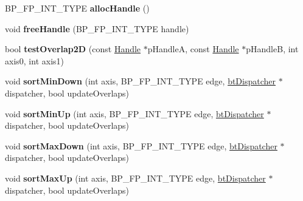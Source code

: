 \begin{DoxyCompactItemize}
\item 
\mbox{\label{classbtAxisSweep3Internal_a40b3512ebfeefbec480a906328053988}} 
B\+P\+\_\+\+F\+P\+\_\+\+I\+N\+T\+\_\+\+T\+Y\+PE {\bfseries alloc\+Handle} ()
\item 
\mbox{\label{classbtAxisSweep3Internal_ac40f411fe4911c17c681d47656296b26}} 
void {\bfseries free\+Handle} (B\+P\+\_\+\+F\+P\+\_\+\+I\+N\+T\+\_\+\+T\+Y\+PE handle)
\item 
\mbox{\label{classbtAxisSweep3Internal_a49abf8db2723c3ec699031539ab6e06d}} 
bool {\bfseries test\+Overlap2D} (const \hyperlink{classbtAxisSweep3Internal_1_1Handle}{Handle} $\ast$p\+HandleA, const \hyperlink{classbtAxisSweep3Internal_1_1Handle}{Handle} $\ast$p\+HandleB, int axis0, int axis1)
\item 
\mbox{\label{classbtAxisSweep3Internal_ac12a6524d4fe2b30f084be1c556e8087}} 
void {\bfseries sort\+Min\+Down} (int axis, B\+P\+\_\+\+F\+P\+\_\+\+I\+N\+T\+\_\+\+T\+Y\+PE edge, \hyperlink{classbtDispatcher}{bt\+Dispatcher} $\ast$dispatcher, bool update\+Overlaps)
\item 
\mbox{\label{classbtAxisSweep3Internal_ae2547559962876e0da7899dadca7f9aa}} 
void {\bfseries sort\+Min\+Up} (int axis, B\+P\+\_\+\+F\+P\+\_\+\+I\+N\+T\+\_\+\+T\+Y\+PE edge, \hyperlink{classbtDispatcher}{bt\+Dispatcher} $\ast$dispatcher, bool update\+Overlaps)
\item 
\mbox{\label{classbtAxisSweep3Internal_a345b7d853ad2a2449da0b51b1f35ff49}} 
void {\bfseries sort\+Max\+Down} (int axis, B\+P\+\_\+\+F\+P\+\_\+\+I\+N\+T\+\_\+\+T\+Y\+PE edge, \hyperlink{classbtDispatcher}{bt\+Dispatcher} $\ast$dispatcher, bool update\+Overlaps)
\item 
\mbox{\label{classbtAxisSweep3Internal_af8e014dfdce82a2d16dde9cb342fa58f}} 
void {\bfseries sort\+Max\+Up} (int axis, B\+P\+\_\+\+F\+P\+\_\+\+I\+N\+T\+\_\+\+T\+Y\+PE edge, \hyperlink{classbtDispatcher}{bt\+Dispatcher} $\ast$dispatcher, bool update\+Overlaps)
\end{DoxyCompactItemize}
